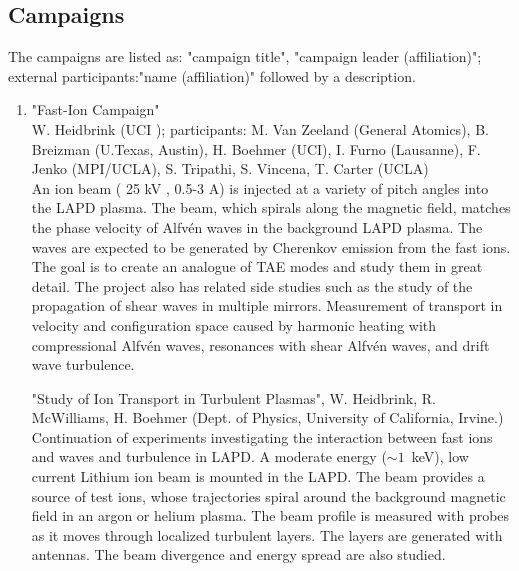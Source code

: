 \documentclass[11pt]{article}
\begin{document}
\subsection{Campaigns}
The campaigns are listed as: "campaign title", "campaign leader (affiliation)"; external participants:"name (affiliation)" followed by a description. 

\begin{enumerate}

\item "Fast-Ion Campaign"\\ W. Heidbrink (UCI ); participants: M. Van
  Zeeland (General Atomics), B. Breizman (U.Texas, Austin), H. Boehmer
  (UCI), I. Furno (Lausanne), F. Jenko (MPI/UCLA), S. Tripathi,
  S. Vincena, T. Carter (UCLA) \\ An ion beam ( 25 kV , 0.5-3 A) is
   injected at a variety of pitch angles into the LAPD plasma. The
  beam, which spirals along the magnetic field, matches the phase
  velocity of Alfv\'{e}n waves in the background LAPD plasma. The
  waves are expected to be generated by Cherenkov emission from the
  fast ions. The goal is to create an analogue of TAE modes and study
  them in great detail. The project also has related side studies such
  as the study of the propagation of shear waves in multiple
  mirrors. Measurement of transport in velocity and configuration
  space caused by harmonic heating with compressional Alfv\'{e}n
  waves, resonances with shear Alfv\'{e}n waves, and drift wave
  turbulence.

  "Study of Ion Transport in Turbulent Plasmas", W. Heidbrink,
  R. McWilliams, H. Boehmer (Dept. of Physics, University of
  California, Irvine.)\\ Continuation of experiments investigating the
  interaction between fast ions and waves and turbulence in LAPD.  A
  moderate energy ($\sim 1$~keV), low current Lithium ion beam is
  mounted in the LAPD. The beam provides a source of test ions, whose
  trajectories spiral around the background
  magnetic field in an argon or helium plasma. The beam profile is
   measured with probes as it moves through localized turbulent
  layers. The layers are generated with antennas. The beam divergence
  and energy spread are also studied.



\end{enumerate}
\end{document}
